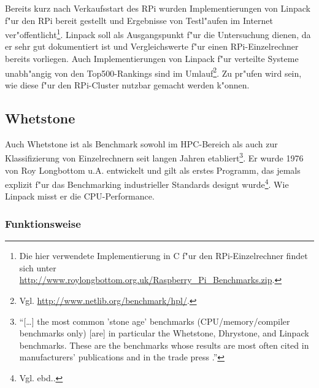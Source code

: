 Bereits kurz nach Verkaufsstart des RPi wurden Implementierungen von Linpack f"ur den RPi bereit gestellt und Ergebnisse von Testl"aufen im Internet ver"offentlicht\footnote{Die hier verwendete Implementierung in C f"ur den RPi-Einzelrechner findet sich unter \url{http://www.roylongbottom.org.uk/Raspberry_Pi_Benchmarks.zip}.}. Linpack soll als Ausgangspunkt f"ur die Untersuchung dienen, da er sehr gut dokumentiert ist und Vergleichswerte f"ur einen RPi-Einzelrechner bereits vorliegen. Auch Implementierungen von Linpack f"ur verteilte Systeme unabh"angig von den Top500-Rankings sind im Umlauf\footnote{Vgl. \url{http://www.netlib.org/benchmark/hpl/}.}. Zu pr"ufen wird sein, wie diese f"ur den RPi-Cluster nutzbar gemacht werden k"onnen. 

\subsection{Whetstone}\label{Whetstone}

Auch Whetstone ist als Benchmark sowohl im HPC-Bereich als auch zur Klassifizierung von Einzelrechnern seit langen Jahren etabliert\footnote{"`[\dots] the most common 'stone age' benchmarks (CPU/memory/compiler benchmarks only) [are] in particular the Whetstone, Dhrystone, and Linpack benchmarks. These are the benchmarks whose results are most often cited in manufacturers' publications and in the trade press \cite{wei90}."'}. Er wurde 1976 von Roy Longbottom u.A. entwickelt und gilt als erstes Programm, das jemals explizit f"ur das Benchmarking industrieller Standards designt wurde\footnote{Vgl. ebd..}. Wie Linpack misst er die CPU-Performance. 

\subsubsection{Funktionsweise}\label{Funktionsweise Whetstone}

